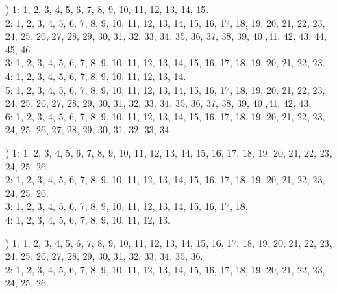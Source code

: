 \documentclass[a4paper,11pt]{article}
\numberwithin{equation}{section}
\begin{document}
\begin{itemize}
\item[\romannumeral3)] 1: 1, 2, 3, 4, 5, 6, 7, 8, 9, 10, 11, 12, 13, 14,
  15. \\
  2: 1, 2, 3, 4, 5, 6, 7, 8, 9, 10, 11, 12, 13, 14, 15, 16, 17, 18, 19, 20,
  21, 22, 23, 24, 25, 26, 27, 28, 29, 30, 31, 32, 33, 34, 35, 36, 37, 38,
  39, 40 ,41, 42, 43, 44, 45, 46. \\
  3: 1, 2, 3, 4, 5, 6, 7, 8, 9, 10, 11, 12, 13, 14, 15, 16, 17, 18, 19, 20,
  21, 22, 23. \\
  4: 1, 2, 3, 4, 5, 6, 7, 8, 9, 10, 11, 12, 13, 14. \\
  5: 1, 2, 3, 4, 5, 6, 7, 8, 9, 10, 11, 12, 13, 14, 15, 16, 17, 18, 19, 20,
  21, 22, 23, 24, 25, 26, 27, 28, 29, 30, 31, 32, 33, 34, 35, 36, 37, 38,
  39, 40 ,41, 42, 43. \\
  6: 1, 2, 3, 4, 5, 6, 7, 8, 9, 10, 11, 12, 13, 14, 15, 16, 17, 18, 19, 20,
  21, 22, 23, 24, 25, 26, 27, 28, 29, 30, 31, 32, 33, 34.

\item[\romannumeral4)] 1: 1, 2, 3, 4, 5, 6, 7, 8, 9, 10, 11, 12, 13, 14, 15,
  16, 17, 18, 19, 20, 21, 22, 23, 24, 25, 26. \\
  2: 1, 2, 3, 4, 5, 6, 7, 8, 9, 10, 11, 12, 13, 14, 15, 16, 17, 18, 19, 20,
  21, 22, 23, 24, 25, 26. \\
  3: 1, 2, 3, 4, 5, 6, 7, 8, 9, 10, 11, 12, 13, 14, 15, 16, 17, 18. \\
  4: 1, 2, 3, 4, 5, 6, 7, 8, 9, 10, 11, 12, 13.

\item[\romannumeral5)] 1: 1, 2, 3, 4, 5, 6, 7, 8, 9, 10, 11, 12, 13, 14, 15,
  16, 17, 18, 19, 20, 21, 22, 23, 24, 25, 26, 27, 28, 29, 30, 31, 32, 33,
  34, 35, 36. \\
  2: 1, 2, 3, 4, 5, 6, 7, 8, 9, 10, 11, 12, 13, 14, 15, 16, 17, 18, 19, 20,
  21, 22, 23, 24, 25, 26.

\end{itemize}













{}






\end{document}
